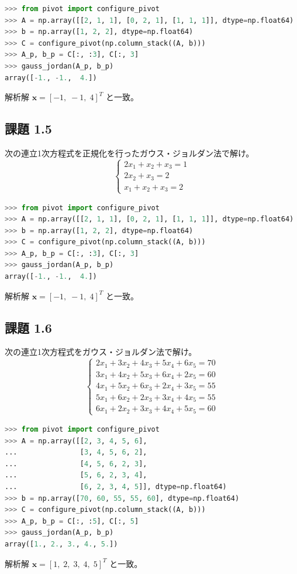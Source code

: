 \documentclass[12pt,a4paper]{ltjsreport}
\begin{document}
\bigskip
\begin{lstlisting}[language=Python, numbers=none]
>>> from pivot import configure_pivot
>>> A = np.array([[2, 1, 1], [0, 2, 1], [1, 1, 1]], dtype=np.float64)
>>> b = np.array([1, 2, 2], dtype=np.float64)
>>> C = configure_pivot(np.column_stack((A, b)))
>>> A_p, b_p = C[:, :3], C[:, 3]
>>> gauss_jordan(A_p, b_p)
array([-1., -1.,  4.])
\end{lstlisting}
解析解 $\boldsymbol{x} = [-1,\; -1,\; 4]^T$ と一致。

\subsection*{課題 1.5}
次の連立1次方程式を正規化を行ったガウス・ジョルダン法で解け。
\begin{equation}
\begin{cases}
2x_1 + x_2 + x_3 = 1 \\
2x_2 + x_3 = 2 \\
x_1 + x_2 + x_3 = 2
\end{cases}
\end{equation}

\bigskip
\begin{lstlisting}[language=Python, numbers=none]
>>> from pivot import configure_pivot
>>> A = np.array([[2, 1, 1], [0, 2, 1], [1, 1, 1]], dtype=np.float64)
>>> b = np.array([1, 2, 2], dtype=np.float64)
>>> C = configure_pivot(np.column_stack((A, b)))
>>> A_p, b_p = C[:, :3], C[:, 3]
>>> gauss_jordan(A_p, b_p)
array([-1., -1.,  4.])
\end{lstlisting}
解析解 $\boldsymbol{x} = [-1,\; -1,\; 4]^T$ と一致。

\subsection*{課題 1.6}
次の連立1次方程式をガウス・ジョルダン法で解け。
\begin{equation}
\begin{cases}
2x_1 + 3x_2 + 4x_3 + 5x_4 + 6x_5 = 70 \\
3x_1 + 4x_2 + 5x_3 + 6x_4 + 2x_5 = 60 \\
4x_1 + 5x_2 + 6x_3 + 2x_4 + 3x_5 = 55 \\
5x_1 + 6x_2 + 2x_3 + 3x_4 + 4x_5 = 55 \\
6x_1 + 2x_2 + 3x_3 + 4x_4 + 5x_5 = 60
\end{cases}
\end{equation}

\bigskip
\begin{lstlisting}[language=Python, numbers=none]
>>> from pivot import configure_pivot
>>> A = np.array([[2, 3, 4, 5, 6],
...               [3, 4, 5, 6, 2],
...               [4, 5, 6, 2, 3],
...               [5, 6, 2, 3, 4],
...               [6, 2, 3, 4, 5]], dtype=np.float64)
>>> b = np.array([70, 60, 55, 55, 60], dtype=np.float64)
>>> C = configure_pivot(np.column_stack((A, b)))
>>> A_p, b_p = C[:, :5], C[:, 5]
>>> gauss_jordan(A_p, b_p)
array([1., 2., 3., 4., 5.])
\end{lstlisting}
解析解 $\boldsymbol{x} = [1,\; 2,\; 3,\; 4,\; 5]^T$ と一致。
\end{document}
